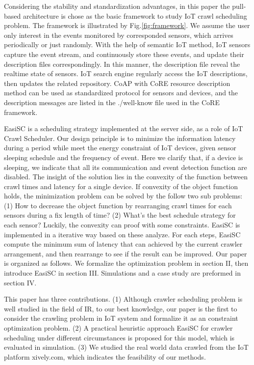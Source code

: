 \documentclass[conference]{IEEEtran}
\begin{document}
Considering the stability and standardization advantages, in this paper the pull-based architecture is chose as the basic framework to study IoT crawl scheduling problem. The framework is illustrated by Fig.\ref{fig:framework}. 
We assume the user only interest in the events monitored by corresponded sensors, which arrives periodically or just randomly. With the help of semantic IoT method, IoT sensors capture the event stream, and continuously store these events, and update their description files correspondingly. In this manner, the description file reveal the realtime state of sensors. IoT search engine regularly access the IoT descriptions, then updates the related repository. CoAP with CoRE resource description method can be used as standardized protocol for sensors and devices, and the description messages are listed in the ./well-know file used in the CoRE framework. 


EasiSC is a scheduling strategy implemented at the server side, as a role of IoT Crawl Scheduler. Our design principle is to minimize the information latency during  a period while meet the energy constraint of IoT devices, given sensor sleeping schedule and the frequency of event. Here we clarify that, if a device is sleeping, we indicate that all its communication and event detection function are disabled.
The insight of the solution lies in the convexity of the function between crawl times and latency for a single device. If convexity of the object function holds, the minimization problem can be solved by the follow two sub problems: (1) How to decrease the object function by rearranging crawl times for each sensors during a fix length of time? (2) What's the best schedule strategy for each sensor? Luckily, the convexity can proof with some constraints. EasiSC is implemented in a iterative way based on these analyze. For each steps, EasiSC compute the minimum sum of latency that can achieved by the current crawler arrangement, and then rearrange to see if the result can be improved.
Our paper is organized as follows. We formalize the optimization problem in section II, then introduce EasiSC in section III. Simulations and a case study are preformed in section IV. 

This paper has three contributions.
(1) Although crawler scheduling problem is well studied in the field of IR, to our best knowledge, our paper is the first to consider the crawling problem in IoT system and formalize it as an constraint optimization problem.
(2) A practical heuristic approach EasiSC for crawler scheduling under different circumstances is proposed for this model, which is evaluated in simulation.
(3) We studied the real world data crawled from the IoT platform xively.com, which indicates the feasibility of our methods.
\end{document}
